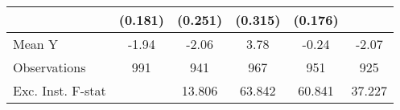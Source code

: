 {\begin{tabular}{l*{5}{c}}
            &     (0.181)         &     (0.251)         &     (0.315)         &     (0.176)         &                     \\
\midrule
Mean Y      &       -1.94         &       -2.06         &        3.78         &       -0.24         &       -2.07         \\
Observations&         991         &         941         &         967         &         951         &         925         \\
Exc. Inst. F-stat&                     &      13.806         &      63.842         &      60.841         &      37.227         \\
\bottomrule
\end{tabular}
}
